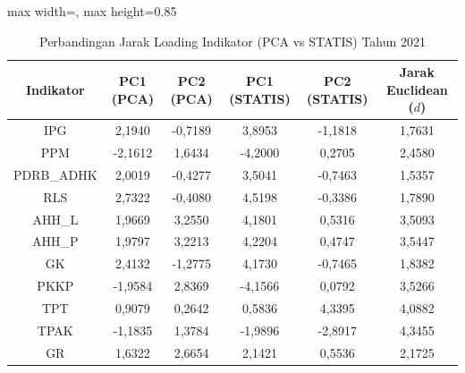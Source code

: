 \begin{table}[H]
\centering
\caption{Perbandingan Jarak Loading Indikator (PCA vs STATIS) Tahun 2021} \label{tab:app1jarak_loading_2021}
\begin{adjustbox}{max width=\textwidth, max height=0.85\textheight}
\begin{tabular}{|c|c|c|c|c|c|}
\hline
\textbf{Indikator} & \textbf{PC1 (PCA)} & \textbf{PC2 (PCA)} & \textbf{PC1 (STATIS)} & \textbf{PC2 (STATIS)} & \textbf{Jarak Euclidean ($d$)} \\
\hline
IPG & 2,1940 & -0,7189 & 3,8953 & -1,1818 & 1,7631 \\
PPM & -2,1612 & 1,6434 & -4,2000 & 0,2705 & 2,4580 \\
PDRB\_ADHK & 2,0019 & -0,4277 & 3,5041 & -0,7463 & 1,5357 \\
RLS & 2,7322 & -0,4080 & 4,5198 & -0,3386 & 1,7890 \\
AHH\_L & 1,9669 & 3,2550 & 4,1801 & 0,5316 & 3,5093 \\
AHH\_P & 1,9797 & 3,2213 & 4,2204 & 0,4747 & 3,5447 \\
GK & 2,4132 & -1,2775 & 4,1730 & -0,7465 & 1,8382 \\
PKKP & -1,9584 & 2,8369 & -4,1566 & 0,0792 & 3,5266 \\
TPT & 0,9079 & 0,2642 & 0,5836 & 4,3395 & 4,0882 \\
TPAK & -1,1835 & 1,3784 & -1,9896 & -2,8917 & 4,3455 \\
GR & 1,6322 & 2,6654 & 2,1421 & 0,5536 & 2,1725 \\
\hline
\end{tabular}
\end{adjustbox}
\end{table}